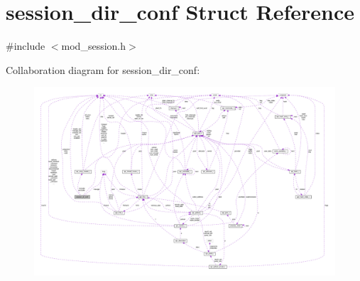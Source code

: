 \hypertarget{structsession__dir__conf}{}\section{session\+\_\+dir\+\_\+conf Struct Reference}
\label{structsession__dir__conf}


{\ttfamily \#include $<$mod\+\_\+session.\+h$>$}



Collaboration diagram for session\+\_\+dir\+\_\+conf\+:
\nopagebreak
\begin{figure}[H]
\begin{center}
\leavevmode
\includegraphics[width=350pt]{structsession__dir__conf__coll__graph}
\end{center}
\end{figure}
